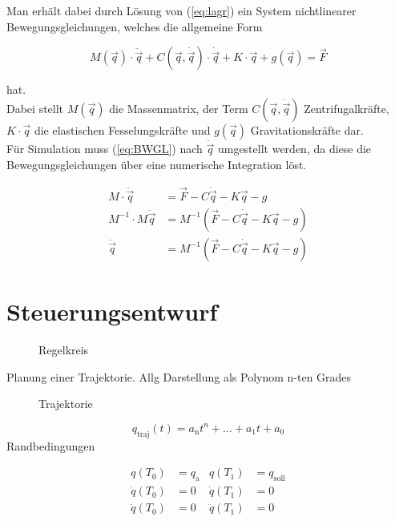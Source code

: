 Man erhält dabei durch Lösung von (\ref{eq:lagr}) ein System nichtlinearer Bewegungsgleichungen, welches die allgemeine Form

\begin{equation}
M(\vec{q})\cdot\ddot{\vec{q}}+C(\vec{q},\dot{\vec{q}})\cdot\dot{\vec{q}}+K\cdot\vec{q}+g(\vec{q})=\vec{F}
\label{eq:BWGL}
\end{equation}

hat. \\
Dabei stellt $M(\vec{q})$ die Massenmatrix, der Term $C(\vec{q},\dot{\vec{q}})$ Zentrifugalkräfte, $K\cdot\vec{q}$ die elastischen Fesselungskräfte und $g(\vec{q})$ Gravitationskräfte dar.\\   
Für Simulation muss (\ref{eq:BWGL}) nach $\ddot{\vec{q}}$ umgestellt werden, da diese die Bewegungsgleichungen über eine numerische Integration löst.

\begin{align*}
M \cdot \ddot{\vec{q}}		 &= \vec{F}-C\dot{\vec{q}}-K\vec{q}-g 			\\
M^{-1}\cdot M \ddot{\vec{q}} &= M^{-1}(\vec{F}-C\dot{\vec{q}}-K\vec{q}-g)	\\
\ddot{\vec{q}}				 &= M^{-1}(\vec{F}-C\dot{\vec{q}}-K\vec{q}-g)
\end{align*}



\chapter{Steuerungsentwurf}
 
\begin{figure}[h!]
\centering

\caption{Regelkreis}
\end{figure}

Planung einer Trajektorie. Allg Darstellung als Polynom n-ten Grades

\begin{figure}[h!]
\centering

\caption{Trajektorie}
\end{figure}

\begin{equation}
q_{\mathrm{traj}}(t) = a_\mathrm{n}t^n+\dots+a_\mathrm{1}t+a_\mathrm{0}
\end{equation}
Randbedingungen

\begin{align*}
q(T_\mathrm{0})			&=q_\mathrm{a} & q(T_\mathrm{1})&=q_\mathrm{soll}\\	
\dot{q}(T_\mathrm{0})	&=0 		   & \dot{q}(T_\mathrm{1})&=0\\
\ddot{q}(T_\mathrm{0})	&=0 		   & \ddot{q}(T_\mathrm{1})&=0
\end{align*}

